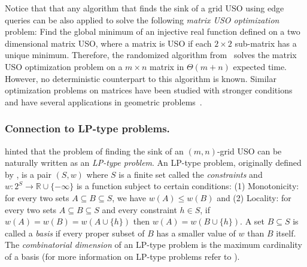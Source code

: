 \documentclass[runningheads,a4paper]{llncs}
\begin{document}
Notice that that any algorithm that finds the sink of a grid USO using edge queries can be also applied to solve the following \emph{matrix USO optimization} problem: Find the global minimum of an injective real function defined on a two dimensional matrix USO, where a matrix is USO if each $2\times 2$ sub-matrix has a unique minimum. 
Therefore, the randomized algorithm from~\citet{grid08} solves the matrix USO optimization problem on a $m\times n$ matrix in $\Theta(m+n)$ expected time. However, no deterministic counterpart to this algorithm is known. 
Similar optimization problems on matrices have been studied with stronger conditions and have several applications in geometric problems~\cite{aggarwal1987geometric,demaine2005optimizing,galil1992dynamic,mityagin2003complexity}.

\vspace{-.2in}\subsubsection{Connection to LP-type problems.} \citet{grid08} hinted that the problem of finding the sink of an $(m,n)$-grid USO can be naturally written as an \emph{LP-type problem}. An LP-type problem, originally defined by \citet{SharirW92}, is a pair $(S,w)$ where $S$ is a finite set called the \emph{constraints} and
$w:2^S \rightarrow \mathbb{R} \cup \{-\infty\}$ is a function subject to certain conditions: 
(1) Monotonicity: for every two sets $A \subseteq B \subseteq S$, we have $w(A) \leq w(B) $ and
(2) Locality: for every two sets $A \subseteq B \subseteq S$ and every constraint $h \in S$, if $w(A) = w(B) = w(A\cup \{h\})$ then $w(A) = w(B \cup \{h\})$.
A set $B \subseteq S$ is called a \emph{basis} if every proper subset
of $B$ has a smaller value of $w$ than $B$ itself. The \emph{combinatorial dimension} of an LP-type problem 
is the maximum cardinality of a basis
(for more information on LP-type problems refer to \cite{MatousekSW96}). 
\end{document}
